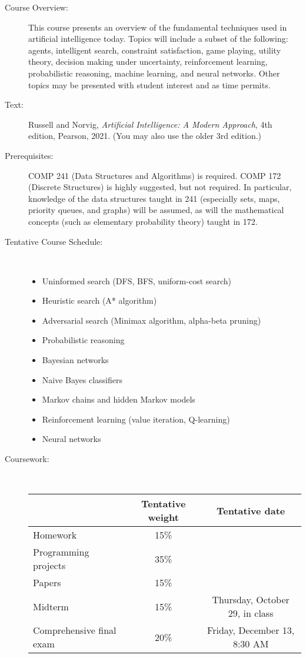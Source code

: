 \documentclass [letterpaper,11pt]{article}
\begin{document}
\begin{description}

\item[Course Overview:]
This course presents an overview of the fundamental techniques used in artificial intelligence today. Topics will include a subset of the following: agents, intelligent search, constraint satisfaction, game playing, utility theory, decision making under uncertainty, reinforcement learning, probabilistic reasoning, machine learning, and neural networks. Other topics may be presented with student interest and as time permits.

\item[Text:]
Russell and Norvig, \emph{Artificial Intelligence: A Modern Approach}, 4th edition, Pearson, 2021. (You may also use the older 3rd edition.)

\item[Prerequisites:]
COMP 241 (Data Structures and Algorithms) is required. COMP 172 (Discrete Structures) is highly suggested, but not required. In particular, knowledge of the data structures taught in 241 (especially sets, maps, priority queues, and graphs) will be assumed, as will the mathematical concepts (such as elementary probability theory) taught in 172.



\item[Tentative Course Schedule:]\
\begin{itemize} \setlength{\itemsep}{0em}\setlength{\parskip}{0pt}
	\item Uninformed search (DFS, BFS, uniform-cost search)
	\item Heuristic search (A* algorithm)
	\item Adversarial search (Minimax algorithm, alpha-beta pruning)
	\item Probabilistic reasoning
	\item Bayesian networks
	\item Naive Bayes classifiers
	\item Markov chains and hidden Markov models
	\item Reinforcement learning (value iteration, Q-learning)
	\item Neural networks
	\end{itemize}





\item[Coursework:] \

\begin{tabular}{lcc} 
& Tentative weight & Tentative date \\ \hline
Homework & 15\% & \\
Programming projects & 35\% & \\
Papers & 15\% & \\
Midterm & 15\% & Thursday, October 29, in class\\
Comprehensive final exam & 20\% &  Friday, December 13, 8:30 AM\\
\end{tabular}


\end{description}
\end{document}
